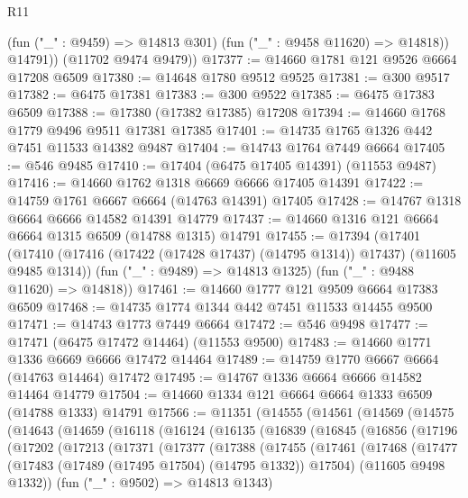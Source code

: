 \begin{lexlean}{R11}
\begin{coremodule}
            (fun ("_" : @9459) => @14813 @301)
            (fun ("_" : @9458 @11620) => @14818))
          @14791))
      (@11702 @9474 @9479))
@17377 := @14660 @1781 @121 @9526 @6664 @17208 @6509
@17380 := @14648 @1780 @9512 @9525
@17381 := @300 @9517
@17382 := @6475 @17381
@17383 := @300 @9522
@17385 := @6475 @17383 @6509
@17388 := @17380 (@17382 @17385) @17208
@17394 := @14660 @1768 @1779 @9496 @9511 @17381 @17385
@17401 := @14735 @1765 @1326 @442 @7451 @11533 @14382 @9487
@17404 := @14743 @1764 @7449 @6664
@17405 := @546 @9485
@17410 := @17404 (@6475 @17405 @14391) (@11553 @9487)
@17416 := @14660 @1762 @1318 @6669 @6666 @17405 @14391
@17422 := @14759 @1761 @6667 @6664 (@14763 @14391) @17405
@17428 := @14767 @1318 @6664 @6666 @14582 @14391 @14779
@17437 := @14660 @1316 @121 @6664 @6664 @1315 @6509 (@14788 @1315) @14791
@17455 := @17394
    (@17401
      (@17410 (@17416 (@17422 (@17428 @17437) (@14795 @1314)) @17437) (@11605 @9485 @1314))
      (fun ("_" : @9489) => @14813 @1325)
      (fun ("_" : @9488 @11620) => @14818))
@17461 := @14660 @1777 @121 @9509 @6664 @17383 @6509
@17468 := @14735 @1774 @1344 @442 @7451 @11533 @14455 @9500
@17471 := @14743 @1773 @7449 @6664
@17472 := @546 @9498
@17477 := @17471 (@6475 @17472 @14464) (@11553 @9500)
@17483 := @14660 @1771 @1336 @6669 @6666 @17472 @14464
@17489 := @14759 @1770 @6667 @6664 (@14763 @14464) @17472
@17495 := @14767 @1336 @6664 @6666 @14582 @14464 @14779
@17504 := @14660 @1334 @121 @6664 @6664 @1333 @6509 (@14788 @1333) @14791
@17566 := @11351
    (@14555
      (@14561
        (@14569
          (@14575
            (@14643
              (@14659
                (@16118
                  (@16124
                    (@16135
                      (@16839
                        (@16845
                          (@16856
                            (@17196
                              (@17202
                                (@17213
                                  (@17371
                                    (@17377
                                      (@17388
                                        (@17455
                                          (@17461
                                            (@17468
                                              (@17477
                                                (@17483
                                                  (@17489 (@17495 @17504) (@14795 @1332))
                                                  @17504)
                                                (@11605 @9498 @1332))
                                              (fun ("_" : @9502) => @14813 @1343)

\end{coremodule}
\end{lexlean}
